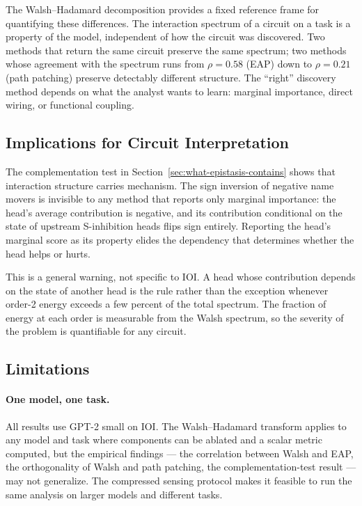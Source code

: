 \documentclass{article}
\begin{document}
The Walsh--Hadamard decomposition provides a fixed reference frame for
quantifying these differences. The interaction spectrum of a circuit on
a task is a property of the model, independent of how the circuit was
discovered. Two methods that return the same circuit preserve the same
spectrum; two methods whose agreement with the spectrum runs from
$\rho = 0.58$ (EAP) down to $\rho = 0.21$ (path patching) preserve
detectably different structure. The ``right'' discovery method depends on what
the analyst wants to learn: marginal importance, direct wiring, or
functional coupling.

\subsection{Implications for Circuit Interpretation}

The complementation test in
Section~\ref{sec:what-epistasis-contains} shows that interaction
structure carries mechanism. The sign inversion of negative name movers
is invisible to any method that reports only marginal importance: the
head's average contribution is negative, and its contribution
conditional on the state of upstream S-inhibition heads flips sign
entirely. Reporting the head's marginal score as its property elides
the dependency that determines whether the head helps or hurts.

This is a general warning, not specific to IOI. A head whose
contribution depends on the state of another head is the rule rather
than the exception whenever order-2 energy exceeds a few percent of
the total spectrum. The fraction of energy at each order is measurable
from the Walsh spectrum, so the severity of the problem is quantifiable
for any circuit.

\subsection{Limitations}

\paragraph{One model, one task.}

All results use GPT-2 small on IOI. The Walsh--Hadamard transform
applies to any model and task where components can be ablated and a
scalar metric computed, but the empirical findings --- the correlation
between Walsh and EAP, the orthogonality of Walsh and path patching,
the complementation-test result --- may not generalize. The compressed
sensing protocol makes it feasible to run the same analysis on larger
models and different tasks.
\end{document}
